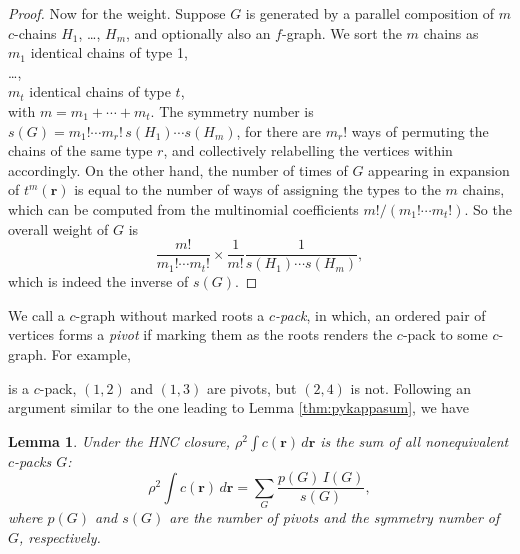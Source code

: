 \documentclass[aip,jcp,reprint,superscriptaddress]{revtex4-1}
\newtheorem{lemm}[thrm]{Lemma}
\newcommand{\vct}[1]{\mathbf{#1}}
\providecommand{\vr}{} %
\renewcommand{\vr}{\vct{r}}
\begin{document}
\begin{proof}
Now for the weight.
%
Suppose $G$ is generated by
  a parallel composition of $m$ $c$-chains
  $H_1$, \dots, $H_m$,
  and optionally also an $f$-graph.
%
We sort the $m$ chains as \\
  \hphantom{~~~~}
    $m_1$ identical chains of type 1, \\
  \hphantom{~~~~}
    \dots, \\
  \hphantom{~~~~}
    $m_t$ identical chains of type $t$, \\
  with
    $m = m_1 + \cdots + m_t$.
%
The symmetry number is
  $s(G) = m_1! \cdots m_r! \, s(H_1) \cdots s(H_m)$,
  for there are $m_r!$ ways of
  permuting the chains of the same type $r$,
  and collectively relabelling the vertices within accordingly.
%
On the other hand,
  the number of times of $G$
  appearing in expansion of $t^m(\vr)$
  is equal to the number of ways
  of assigning the types to the $m$ chains,
  which can be computed from the multinomial coefficients
  $m!/(m_1! \cdots m_t!)$.
%
So the overall weight of $G$ is
%
\[
  \frac{ m! } { m_1! \cdots m_t! }
  \times
  \frac{ 1 } { m! }
  \frac{ 1 } { s(H_1) \cdots s(H_m) },
\]
%
which is indeed the inverse of $s(G)$.
\end{proof}





We call a $c$-graph without marked roots a \emph{$c$-pack},
%
in which,
  an ordered pair of vertices forms a \emph{pivot}
  if marking them as the roots renders the $c$-pack to some $c$-graph.
%
For example,
is a $c$-pack,
  $(1, 2)$ and $(1, 3)$ are pivots,
  but $(2, 4)$ is not.
%
Following an argument similar to the one leading to Lemma \ref{thm:pykappasum},
  we have

\begin{lemm}
Under the HNC closure,
%
$\rho^2 \int c(\vr) \, d\vr$
  is the sum of all nonequivalent $c$-packs $G$:
%
\begin{equation}
    \rho^2 \int c(\vr) \, d\vr
  = \sum_G \frac{ p(G) \, I(G) }{ s(G) },
  \label{eq:hnccrsum}
\end{equation}
%
where $p(G)$ and $s(G)$ are
  the number of pivots and
  the symmetry number
  of $G$,
  respectively.
\label{thm:hnccrsum}
\end{lemm}
\end{document}
